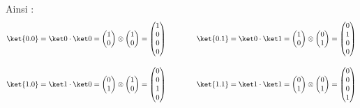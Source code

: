 \documentclass[11pt,class=report,crop=false]{standalone}
\begin{document}
Ainsi :
$$\ket{0.0} = \ket0 \cdot \ket0 =   \begin{pmatrix}1\\0\end{pmatrix} \otimes \begin{pmatrix}1\\0\end{pmatrix} = \begin{pmatrix}1\\0\\0\\0\end{pmatrix}
\qquad\qquad
\ket{0.1} = \ket0 \cdot \ket1 =   \begin{pmatrix}1\\0\end{pmatrix} \otimes \begin{pmatrix}0\\1\end{pmatrix} = \begin{pmatrix}0\\1\\0\\0\end{pmatrix}$$

$$\ket{1.0} = \ket1 \cdot \ket0 =   \begin{pmatrix}0\\1\end{pmatrix} \otimes \begin{pmatrix}1\\0\end{pmatrix} = \begin{pmatrix}0\\0\\1\\0\end{pmatrix}
\qquad\qquad
\ket{1.1} = \ket1 \cdot \ket1 =   \begin{pmatrix}0\\1\end{pmatrix} \otimes \begin{pmatrix}0\\1\end{pmatrix} = \begin{pmatrix}0\\0\\0\\1\end{pmatrix}$$
\end{document}
